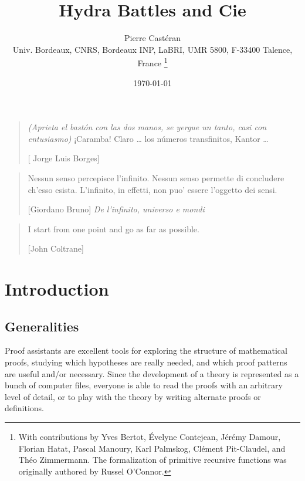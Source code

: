 \documentclass[a4paper]{book}
\author{Pierre Castéran\\ Univ. Bordeaux, CNRS, Bordeaux INP, LaBRI, UMR 5800, F-33400 Talence, France \thanks{With contributions by Yves Bertot, \'Evelyne Contejean,  Jérémy Damour, Florian Hatat, Pascal Manoury, Karl Palmskog, Clément Pit-Claudel, and Théo Zimmermann. The formalization of primitive recursive functions was originally authored by 
Russel O'Connor\cite{OConnor05}.}}
\date{\today}
\title{Hydra Battles and Cie}
\begin{document}
\maketitle






\tableofcontents

\clearpage
\begin{quote}
 \emph{(Aprieta el bast\'on con las dos manos, se yergue un tanto,
casi con entusiasmo)} ¡Caramba! Claro \dots{} los n\'umeros
transfinitos, Kantor \dots{}

[ Jorge Luis Borges]
\end{quote}
\vspace{2cm}
\begin{quote}
  Nessun senso percepisce l'infinito. Nessun senso permette di concludere ch'esso esista. L'infinito, in effetti, non puo' essere l'oggetto dei sensi.

  [Giordano Bruno] \emph{De l'infinito, universo e mondi}
\end{quote}

\vspace{2cm}
\begin{quote} 
I start from one point and go as far as possible. 

[John Coltrane]
\end{quote}




 


\chapter{Introduction}

  

\vspace{16pt}

\section{Generalities}

Proof assistants are excellent tools for exploring the structure of mathematical proofs,
studying  which hypotheses are really needed, and which proof patterns are useful and/or
necessary. Since the development of a theory is represented as a bunch of computer files,
everyone is able to read the proofs with an arbitrary level of detail, or to play with the theory by writing alternate proofs or definitions.
\end{document}
